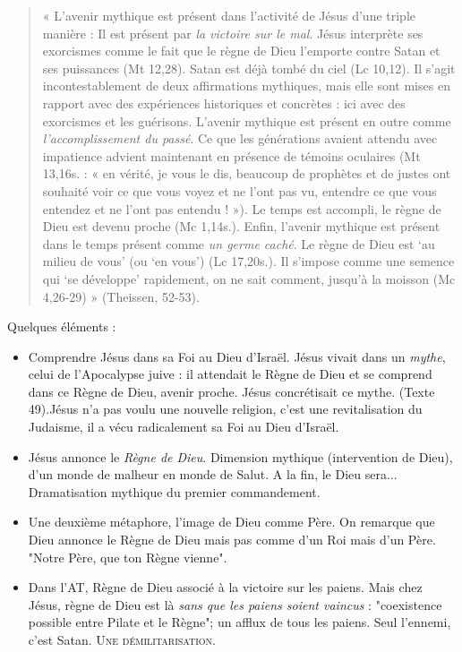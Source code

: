 \begin{quote}
    « L'avenir mythique est présent dans l'activité de Jésus d'une triple
manière : Il est présent par \emph{la victoire sur le mal}. Jésus
interprète ses exorcismes comme le fait que le règne de Dieu l'emporte
contre Satan et ses puissances (Mt 12,28). Satan est déjà tombé du ciel
(Lc 10,12). Il s'agit incontestablement de deux affirmations mythiques,
mais elle sont mises en rapport avec des expériences historiques et
concrètes : ici avec des exorcismes et les guérisons. L'avenir mythique
est présent en outre comme \emph{l'accomplissement du passé}. Ce que les
générations avaient attendu avec impatience advient maintenant en
présence de témoins oculaires (Mt 13,16s. : « en vérité, je vous le dis,
beaucoup de prophètes et de justes ont souhaité voir ce que vous voyez
et ne l'ont pas vu, entendre ce que vous entendez et ne l'ont pas
entendu ! »). Le temps est accompli, le règne de Dieu est devenu proche
(Mc 1,14s.). Enfin, l'avenir mythique est présent dans le temps présent
comme \emph{un germe caché}. Le règne de Dieu est `au milieu de vous'
(ou `en vous') (Lc 17,20s.). Il s'impose comme une semence qui `se
développe' rapidement, on ne sait comment, jusqu'à la moisson (Mc
4,26-29) » (Theissen, 52-53).
\end{quote}


Quelques éléments : 
\begin{itemize}

\item Comprendre Jésus dans sa Foi au Dieu d'Israël. Jésus vivait dans un \textit{mythe}, celui de l'Apocalypse juive : il attendait le Règne de Dieu et se comprend dans ce Règne de Dieu, avenir proche.  Jésus concrétisait ce mythe. (Texte 49).Jésus n'a pas voulu une nouvelle religion, c'est une revitalisation du Judaisme, il a vécu radicalement sa Foi au Dieu d'Israël. 
\item Jésus annonce le \textit{Règne de Dieu}. Dimension mythique (intervention de Dieu), d'un monde de malheur en monde de Salut. A la fin, le Dieu sera... Dramatisation mythique du premier commandement. 
\item Une deuxième métaphore, l'image de Dieu comme Père. On remarque que Dieu annonce le Règne de Dieu mais pas comme d'un Roi mais d'un Père. "Notre Père, que ton Règne vienne". 
\item Dans l'AT, Règne de Dieu associé à la victoire sur les paiens. Mais chez Jésus, règne de Dieu est là \textit{sans que les paiens soient vaincus} : "coexistence possible entre Pilate et le Règne"; un afflux de tous les paiens. Seul l'ennemi, c'est Satan. \textsc{Une démilitarisation}.
 
\end{itemize}

